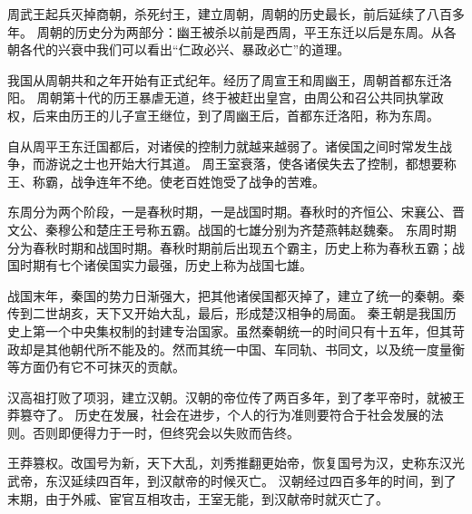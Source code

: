 \documentclass[avery5371,grid]{flashcards}
\begin{document}
{周武王起兵灭掉商朝，杀死纣王，建立周朝，周朝的历史最长，前后延续了八百多年。} %
{周朝的历史分为两部分：幽王被杀以前是西周，平王东迁以后是东周。从各朝各代的兴衰中我们可以看出“仁政必兴、暴政必亡”的道理。} %



{我国从周朝共和之年开始有正式纪年。经历了周宣王和周幽王，周朝首都东迁洛阳。} %
{周朝第十代的历王暴虐无道，终于被赶出皇宫，由周公和召公共同执掌政权，后来由历王的儿子宣王继位，到了周幽王后，首都东迁洛阳，称为东周。} %



{自从周平王东迁国都后，对诸侯的控制力就越来越弱了。诸侯国之间时常发生战争，而游说之士也开始大行其道。} %
{周王室衰落，使各诸侯失去了控制，都想要称王、称霸，战争连年不绝。使老百姓饱受了战争的苦难。} %

{东周分为两个阶段，一是春秋时期，一是战国时期。春秋时的齐恒公、宋襄公、晋文公、秦穆公和楚庄王号称五霸。战国的七雄分别为齐楚燕韩赵魏秦。} %
{东周时期分为春秋时期和战国时期。春秋时期前后出现五个霸主，历史上称为春秋五霸；战国时期有七个诸侯国实力最强，历史上称为战国七雄。} %

{战国末年，秦国的势力日渐强大，把其他诸侯国都灭掉了，建立了统一的秦朝。秦传到二世胡亥，天下又开始大乱，最后，形成楚汉相争的局面。} %
{秦王朝是我国历史上第一个中央集权制的封建专治国家。虽然秦朝统一的时间只有十五年，但其苛政却是其他朝代所不能及的。然而其统一中国、车同轨、书同文，以及统一度量衡等方面仍有它不可抹灭的贡献。} %

{汉高祖打败了项羽，建立汉朝。汉朝的帝位传了两百多年，到了孝平帝时，就被王莽篡夺了。} %
{历史在发展，社会在进步，个人的行为准则要符合于社会发展的法则。否则即便得力于一时，但终究会以失败而告终。} %

{王莽篡权。改国号为新，天下大乱，刘秀推翻更始帝，恢复国号为汉，史称东汉光武帝，东汉延续四百年，到汉献帝的时候灭亡。} %
{汉朝经过四百多年的时间，到了末期，由于外戚、宦官互相攻击，王室无能，到汉献帝时就灭亡了。} %
\end{document}
